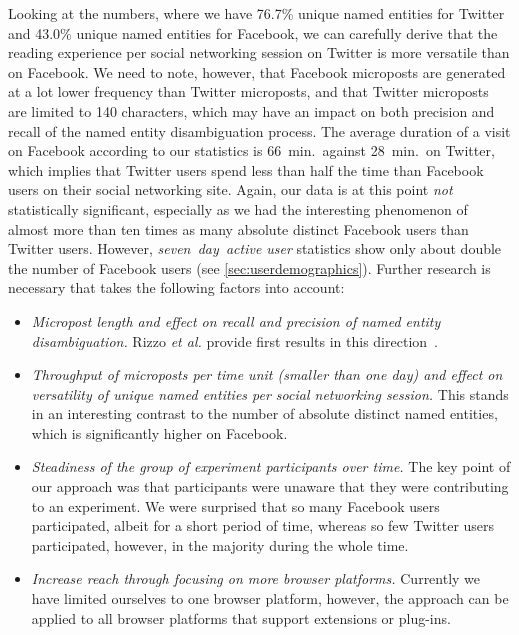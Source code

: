 \documentclass{iosart2c}
\begin{document}
Looking at the numbers, where we have 76.7\% unique named entities for Twitter and 43.0\% unique named entities for Facebook, we can carefully derive that the reading experience per social networking session on Twitter is more versatile than on Facebook.
We need to note, however, that Facebook microposts are generated at a lot lower frequency than Twitter microposts, and that Twitter microposts are limited to 140 characters, which may have an impact on both precision and recall of the named entity disambiguation process.
The average duration of a visit on Facebook according to our statistics is 66~min.\ against 28~min.\ on Twitter, which implies that Twitter users spend less than half the time than Facebook users on their social networking site.
Again, our data is at this point \emph{not} statistically significant, especially as we had the interesting phenomenon of almost more than ten times as many absolute distinct Facebook users than Twitter users.
However, \emph{seven~day~active user} statistics show only about double the number of Facebook users (see \autoref{sec:userdemographics}).
Further research is necessary that takes the following factors into account:
\begin{itemize}
\item \emph{Micropost length and effect on recall and precision of named entity disambiguation.}
Rizzo \textit{et al.} provide first results in this direction~\cite{nerd}.
\item \emph{Throughput of microposts per time unit (smaller than one day) and effect on versatility of unique named entities per social networking session.}
This stands in an interesting contrast to the number of absolute distinct named entities, which is significantly higher on Facebook.
\item \emph{Steadiness of the group of experiment participants over time.}
The key point of our approach was that participants were unaware that they were contributing to an experiment.
We were surprised that so many Facebook users participated, albeit for a short period of time, whereas so few Twitter users participated, however, in the majority during the whole time.
\item \emph{Increase reach through focusing on more browser platforms.}
Currently we have limited ourselves to one browser platform, however, the approach can be applied to all browser platforms that support extensions or plug-ins.
\end{itemize}
\end{document}
